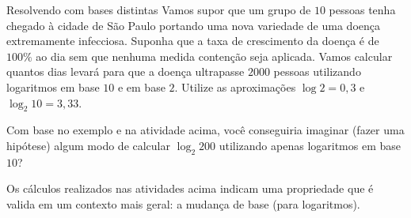 \begin{task}{Resolvendo com bases distintas}
Vamos supor que um grupo de $10$ pessoas tenha chegado à cidade de São Paulo portando uma nova variedade de uma doença extremamente infecciosa. Suponha que a taxa de crescimento da doença é de $100\%$ ao dia sem que nenhuma medida contenção seja aplicada. Vamos calcular quantos dias levará para que a doença ultrapasse $2000$ pessoas utilizando logaritmos em base $10$ e em base $2$. Utilize as aproximações $\log 2 = 0{,}3$ e $\log_2 10 = 3{,}33$.
\end{task}


\begin{reflection}
Com base no exemplo e na atividade acima, você conseguiria imaginar (fazer uma hipótese) algum modo de calcular $\log_2 200$ utilizando apenas logaritmos em base $10$?
\end{reflection}


Os cálculos realizados nas atividades acima indicam uma propriedade que é valida em um contexto mais geral: a mudança de base (para logaritmos).

